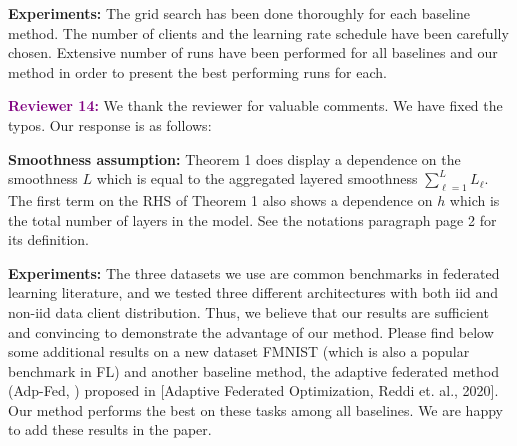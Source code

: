 \documentclass{article}
\begin{document}
\textbf{Experiments:} The grid search has been done thoroughly for each baseline method. The number of clients and the learning rate schedule have been carefully chosen. Extensive number of runs have been performed for all baselines and our method in order to present the best performing runs for each.


\vspace{0.01in}

\textbf{\textcolor{purple}{Reviewer 14:}} We thank the reviewer for valuable comments. We have fixed the typos. Our response is as follows:\vspace{-5pt}

\textbf{Smoothness assumption:} Theorem 1 does display a dependence on the smoothness $L$ which is equal to the aggregated layered smoothness $\sum_{\ell =1}^L L_\ell$. 
The first term on the RHS of Theorem 1 also shows a dependence on $h$ which is the total number of layers in the model. See the notations paragraph page 2 for its definition.

\textbf{Experiments:} The three datasets we use are common benchmarks in federated learning literature, and we tested three different architectures with both iid and non-iid data client distribution. Thus, we believe that our results are sufficient and convincing to demonstrate the advantage of our method. Please find below some additional results on a new dataset FMNIST (which is also a popular benchmark in FL) and another baseline method, the adaptive federated method (Adp-Fed, ) proposed in [Adaptive Federated Optimization, Reddi et. al., 2020]. Our method performs the best on these tasks among all baselines. We are happy to add these results in the paper.
\end{document}
